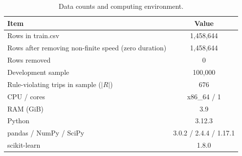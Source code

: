 \begin{table}[!t]
\caption{Data counts and computing environment.}
\label{tab:ext_setup}
\centering
\setlength{\tabcolsep}{3pt}
\footnotesize
\begin{tabular}{lc}
\hline
Item & Value \\
\hline
Rows in train.csv & 1,458,644 \\
Rows after removing non-finite speed (zero duration) & 1,458,644 \\
Rows removed & 0 \\
Development sample & 100,000 \\
Rule-violating trips in sample ($|R|$) & 676 \\
CPU / cores & x86\_64 / 1 \\
RAM (GiB) & 3.9 \\
Python & 3.12.3 \\
pandas / NumPy / SciPy & 3.0.2 / 2.4.4 / 1.17.1 \\
scikit-learn & 1.8.0 \\
\hline
\end{tabular}
\end{table}